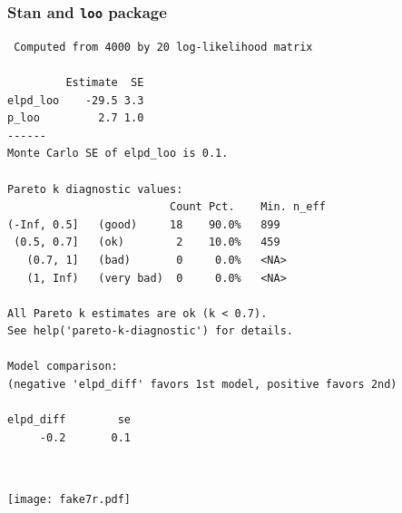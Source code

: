 \documentclass[english,t]{beamer}
\begin{document}
\begin{frame}[fragile]
  \frametitle{Stan and {\tt loo} package}

  {\scriptsize
\begin{lstlisting}
 Computed from 4000 by 20 log-likelihood matrix

         Estimate  SE
elpd_loo    -29.5 3.3
p_loo         2.7 1.0
------
Monte Carlo SE of elpd_loo is 0.1.

Pareto k diagnostic values:
                         Count Pct.    Min. n_eff
(-Inf, 0.5]   (good)     18    90.0%   899       
 (0.5, 0.7]   (ok)        2    10.0%   459       
   (0.7, 1]   (bad)       0     0.0%   <NA>      
   (1, Inf)   (very bad)  0     0.0%   <NA>      

All Pareto k estimates are ok (k < 0.7).
See help('pareto-k-diagnostic') for details.

Model comparison: 
(negative 'elpd_diff' favors 1st model, positive favors 2nd) 

elpd_diff        se 
     -0.2       0.1 
\end{lstlisting}
}

\end{frame}


\begin{frame}{}

  \\
\end{frame}

\begin{frame}{}

  {\texttt{[image: fake7r.pdf]}}
  \\
\end{frame}
\end{document}
